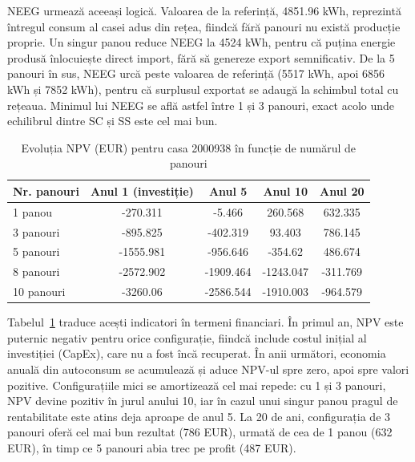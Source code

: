 \documentclass[12pt,a4paper]{report}
\begin{document}
NEEG urmează aceeași logică. Valoarea de la referință, 4851.96 kWh, reprezintă întregul consum al casei adus din rețea, fiindcă fără panouri nu există producție proprie. Un singur panou reduce NEEG la 4524 kWh, pentru că puțina energie produsă înlocuiește direct import, fără să genereze export semnificativ. De la 5 panouri în sus, NEEG urcă peste valoarea de referință (5517 kWh, apoi 6856 kWh și 7852 kWh), pentru că surplusul exportat se adaugă la schimbul total cu rețeaua. Minimul lui NEEG se află astfel între 1 și 3 panouri, exact acolo unde echilibrul dintre SC și SS este cel mai bun.

\begin{table}[h]
  \centering
  \begin{tabular}{|l|c|c|c|c|}
    \hline
    \textbf{Nr. panouri} & \textbf{Anul 1 (investiție)} & \textbf{Anul 5} & \textbf{Anul 10} & \textbf{Anul 20} \\
    \hline
    1 panou              & -270.311                     & -5.466          & 260.568          & 632.335          \\
    \hline
    3 panouri            & -895.825                     & -402.319        & 93.403           & 786.145          \\
    \hline
    5 panouri            & -1555.981                    & -956.646        & -354.62          & 486.674          \\
    \hline
    8 panouri            & -2572.902                    & -1909.464       & -1243.047        & -311.769         \\
    \hline
    10 panouri           & -3260.06                     & -2586.544       & -1910.003        & -964.579         \\
    \hline
  \end{tabular}
  \caption{Evoluția NPV (EUR) pentru casa 2000938 în funcție de numărul de panouri}
  \label{tab:npv_panouri}
\end{table}

Tabelul~\ref{tab:npv_panouri} traduce acești indicatori în termeni financiari. În primul an, NPV este puternic negativ pentru orice configurație, fiindcă include costul inițial al investiției (CapEx), care nu a fost încă recuperat. În anii următori, economia anuală din autoconsum se acumulează și aduce NPV-ul spre zero, apoi spre valori pozitive. Configurațiile mici se amortizează cel mai repede: cu 1 și 3 panouri, NPV devine pozitiv în jurul anului 10, iar în cazul unui singur panou pragul de rentabilitate este atins deja aproape de anul 5. La 20 de ani, configurația de 3 panouri oferă cel mai bun rezultat (786 EUR), urmată de cea de 1 panou (632 EUR), în timp ce 5 panouri abia trec pe profit (487 EUR).
\end{document}
